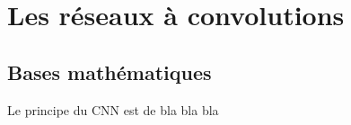 \chapter{Les réseaux à convolutions}

\section{Bases mathématiques}
Le principe du CNN est de bla bla bla